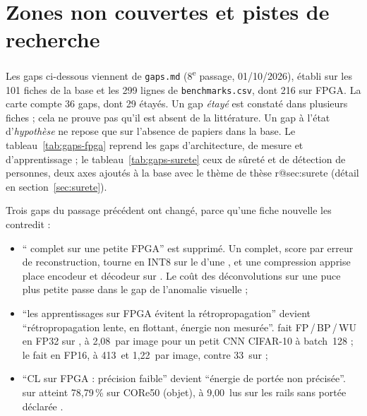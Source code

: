\section{Zones non couvertes et pistes de recherche}
\label{sec:gaps}

Les gaps ci-dessous viennent de \texttt{gaps.md} (8\textsuperscript{e} passage,
01/10/2026), établi sur les 101 fiches de la base et les 299 lignes de
\texttt{benchmarks.csv}, dont 216 sur FPGA. La carte compte 36 gaps, dont 29 étayés. Un
gap \emph{étayé} est constaté dans plusieurs fiches ; cela ne prouve pas qu'il est absent
de la littérature. Un gap à l'état d'\emph{hypothèse} ne repose que sur l'absence de
papiers dans la base. Le tableau~\ref{tab:gaps-fpga} reprend les gaps d'architecture, de
mesure et d'apprentissage ; le tableau~\ref{tab:gaps-surete} ceux de sûreté et de détection
de personnes, deux axes ajoutés à la base avec le thème de thèse%
\ifcsname r@sec:surete\endcsname{} (détail en section~\ref{sec:surete})\fi.

Trois gaps du passage précédent ont changé, parce qu'une fiche nouvelle les contredit :
\begin{itemize}
  \item \enquote{ complet sur une petite FPGA} est supprimé. Un  complet,
    score par erreur de reconstruction, tourne en INT8 sur le  d'une 
    \citep[§IV-B, Table~VI]{arxiv-2407.17647-energy-efficient-artefact-detection-accelerator},
    et une compression apprise place encodeur et décodeur sur 
    \citep[Table~X]{arxiv-2503.04832-lightweight-embedded-fpga-deployment-learned}\pp. Le
    coût des déconvolutions sur une puce plus petite passe dans le gap de l'anomalie
    visuelle ;
  \item \enquote{les apprentissages sur FPGA évitent la rétropropagation} devient
    \enquote{rétropropagation lente, en flottant, énergie non mesurée}.  fait
    FP\,/\,BP\,/\,WU en FP32 sur , à 2,08\, par image pour un petit CNN
    CIFAR-10 à batch~128
    \citep[Table~7]{arxiv-2202.10935-ef-train-enable-efficient-device}\pp ;  le
    fait en FP16, à 413\, et 1,22\, par image, contre 33\, sur 
    \citep[Table~VI]{2024-aggarwal-chameleon-dual-memory-replay-online} ;
  \item \enquote{CL sur FPGA : précision faible} devient \enquote{énergie de portée non
    précisée}.  sur  atteint 78,79\,\% sur CORe50 (objet), à 9,00\, lus sur les
    rails sans portée déclarée
    \citep[Table~V]{2021-piyasena-accelerating-continual-learning-edge-fpga}.
\end{itemize}

